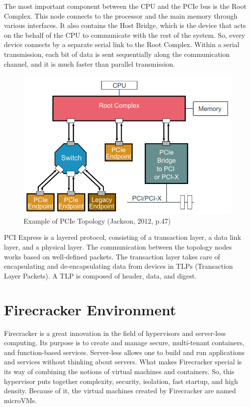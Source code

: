 \documentclass[12pt, a4paper]{report}
\begin{document}
The most important component between the CPU and the PCIe bus is the Root Complex. This node connects to the processor and the main memory through various interfaces. It also contains the Host Bridge, which is the device that acts on the behalf of the CPU to communicate with the rest of the system. So, every device connects by a separate serial link to the Root Complex. Within a serial transmission, each bit of data is sent sequentially along the communication channel, and it is much faster than parallel transmission.

\begin{figure}[H]
\centering
\includegraphics[width=\textwidth, keepaspectratio]{pics/pcie-topology.png}
  \caption{{Example of PCIe Topology (Jackson, 2012, p.47)}\cite{book_pci_express}}
  \label{fig:pcie-topology}
\end{figure}

PCI Express is a layered protocol, consisting of a transaction layer, a data link layer, and a physical layer. The communication between the topology nodes works based on well-defined packets. The transaction layer takes care of encapsulating and de-encapsulating data from devices in TLPs (Transaction Layer Packets). A TLP is composed of header, data, and digest.

\section{Firecracker Environment}

{Firecracker}\cite{firecracker_website} is a great innovation in the field of hypervisors and server-less computing. Its purpose is to create and manage secure, multi-tenant containers, and function-based services. Server-less allows one to build and run applications and services without thinking about servers. What makes Firecracker special is its way of combining the notions of virtual machines and containers. So, this hypervisor puts together complexity, security, isolation, fast startup, and high density. Because of it, the virtual machines created by Firecracker are named microVMs.
\end{document}
